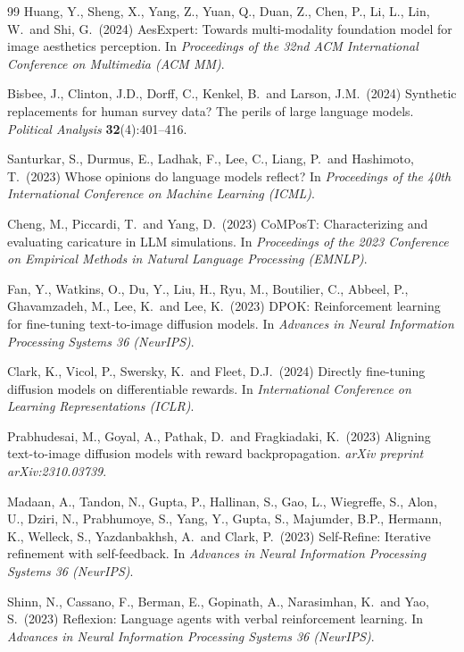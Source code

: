 \documentclass{article}
\begin{document}
\begin{thebibliography}{99}
Huang, Y., Sheng, X., Yang, Z., Yuan, Q., Duan, Z., Chen, P., Li, L., Lin, W.\ and Shi, G.\ (2024)
AesExpert: Towards multi-modality foundation model for image aesthetics perception.
In {\it Proceedings of the 32nd ACM International Conference on Multimedia (ACM MM)}.

Bisbee, J., Clinton, J.D., Dorff, C., Kenkel, B.\ and Larson, J.M.\ (2024)
Synthetic replacements for human survey data? The perils of large language models.
{\it Political Analysis} {\bf 32}(4):401--416.

Santurkar, S., Durmus, E., Ladhak, F., Lee, C., Liang, P.\ and Hashimoto, T.\ (2023)
Whose opinions do language models reflect?
In {\it Proceedings of the 40th International Conference on Machine Learning (ICML)}.

Cheng, M., Piccardi, T.\ and Yang, D.\ (2023)
CoMPosT: Characterizing and evaluating caricature in LLM simulations.
In {\it Proceedings of the 2023 Conference on Empirical Methods in Natural Language Processing (EMNLP)}.

Fan, Y., Watkins, O., Du, Y., Liu, H., Ryu, M., Boutilier, C., Abbeel, P., Ghavamzadeh, M.,
Lee, K.\ and Lee, K.\ (2023)
DPOK: Reinforcement learning for fine-tuning text-to-image diffusion models.
In {\it Advances in Neural Information Processing Systems 36 (NeurIPS)}.

Clark, K., Vicol, P., Swersky, K.\ and Fleet, D.J.\ (2024)
Directly fine-tuning diffusion models on differentiable rewards.
In {\it International Conference on Learning Representations (ICLR)}.

Prabhudesai, M., Goyal, A., Pathak, D.\ and Fragkiadaki, K.\ (2023)
Aligning text-to-image diffusion models with reward backpropagation.
{\it arXiv preprint arXiv:2310.03739}.

Madaan, A., Tandon, N., Gupta, P., Hallinan, S., Gao, L., Wiegreffe, S., Alon, U., Dziri, N.,
Prabhumoye, S., Yang, Y., Gupta, S., Majumder, B.P., Hermann, K., Welleck, S., Yazdanbakhsh, A.\
and Clark, P.\ (2023)
Self-Refine: Iterative refinement with self-feedback.
In {\it Advances in Neural Information Processing Systems 36 (NeurIPS)}.

Shinn, N., Cassano, F., Berman, E., Gopinath, A., Narasimhan, K.\ and Yao, S.\ (2023)
Reflexion: Language agents with verbal reinforcement learning.
In {\it Advances in Neural Information Processing Systems 36 (NeurIPS)}.


\end{thebibliography}
\end{document}
